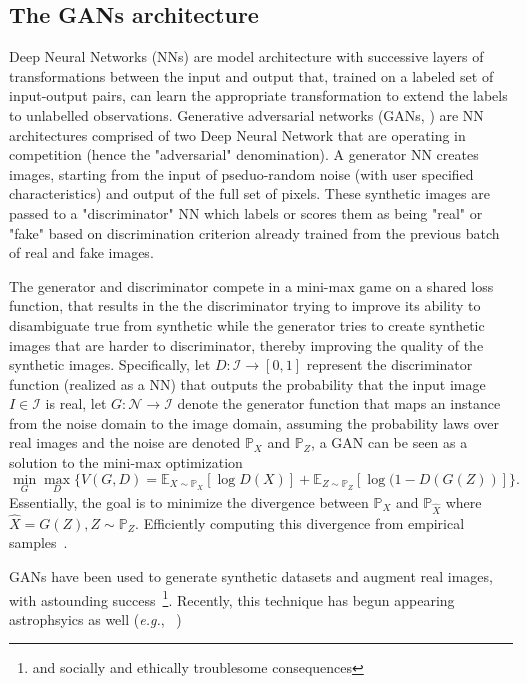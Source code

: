 \documentclass{proposalnsf}
\newcommand{\eg}{\emph{e.g.}}
\begin{document}
\subsection{The GANs architecture}

Deep Neural Networks (NNs) are model architecture with successive layers of transformations between the input and output that, trained on a labeled set of input-output pairs, can learn the appropriate transformation to extend the labels to unlabelled observations.
Generative adversarial networks (GANs, \citealt{Goodfellow14}) are NN architectures comprised of two Deep Neural Network \citep{lecun2015deep} that are operating in competition (hence the "adversarial" denomination). A generator NN creates images, starting from the input of pseduo-random noise (with user specified characteristics)  and output of the full set of pixels. These synthetic images are passed to a "discriminator" NN which labels or scores them as being "real" or "fake" based on discrimination criterion already trained from the previous batch of real and fake images. 

The generator and discriminator compete in a mini-max game on a shared loss function, that results in the the discriminator trying to improve its ability to disambiguate true from synthetic while the generator tries to create synthetic images that are harder to discriminator, thereby improving the quality of the synthetic images. Specifically, let $D: \mathcal{I} \rightarrow [0,1]$ represent the discriminator function (realized as a NN) that outputs the probability that the input image $I \in \mathcal{I}$ is real, let $G : \mathcal{N} \rightarrow  \mathcal{I}$ denote the generator function that maps an instance from the noise domain to the image domain, assuming the probability laws over real images and the noise are denoted $\mathbb{P}_X$ and $\mathbb{P}_Z$, a GAN can be seen as a solution to the mini-max optimization \citep{Goodfellow14}
\[
\min_{G} \max_{D}\{ V(G,D) = \mathbb{E}_{X \sim \mathbb{P}_X} [\log D(X) ] +   \mathbb{E}_{Z \sim \mathbb{P}_Z} [\log (1- D(G(Z))] \}. 
\]
Essentially, the goal is to minimize the divergence between $\mathbb{P}_X$ and $\mathbb{P}_{\hat{X}}$ where  $\hat{X} = G(Z), Z \sim \mathbb{P}_Z$. Efficiently computing this divergence from empirical samples~\citep{Deshpande2019}.

GANs have been used to generate synthetic datasets and augment real images, with astounding success~\citep{shrivastava2016learning, Maras19}\footnote{and socially and ethically troublesome consequences}. Recently, this technique has begun appearing astrophsyics as well (\eg,~
\citealt{Zamudio19})
\end{document}
